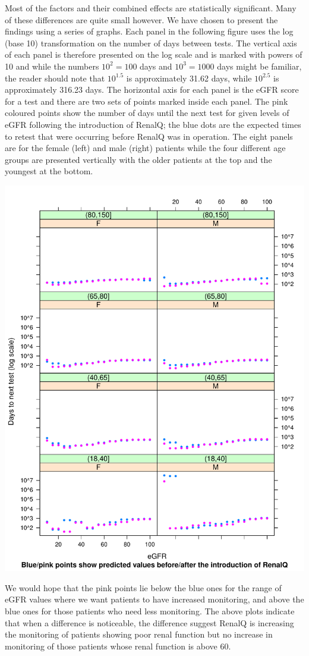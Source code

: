 Most of the factors and their combined effects are statistically significant. Many of these differences are  quite small however. We have chosen to present the findings using a series of graphs. Each panel in the following figure uses the log (base 10) transformation on the number of days between tests. The vertical axis of each panel is therefore presented on the log scale and is marked with powers of 10 and while the numbers $10^2=100$ days and $10^3=1000$ days might be familiar, the reader should note that $10^{1.5}$ is approximately 31.62 days, while $10^{2.5}$ is approximately 316.23 days. The horizontal axis for each panel is the eGFR score for a test and there are two sets of points marked inside each panel. The pink coloured points show the number of days until the next test for given levels of eGFR following the introduction of RenalQ; the blue dots are the expected times to retest that were occurring before RenalQ was in operation. The eight panels are for the female (left) and male (right) patients while the four different age groups are presented vertically with the older patients at the top and the youngest at the bottom.

\includegraphics{Figures/Retest-ThePlots}

We would hope that the pink points lie below the blue ones for the range of eGFR values where we want patients to have increased monitoring, and above the blue ones for those patients who need less monitoring. The above plots indicate that when a  difference is noticeable, the difference suggest RenalQ is increasing the monitoring of patients showing poor renal function but no increase in monitoring of those patients whose renal function is above 60.

